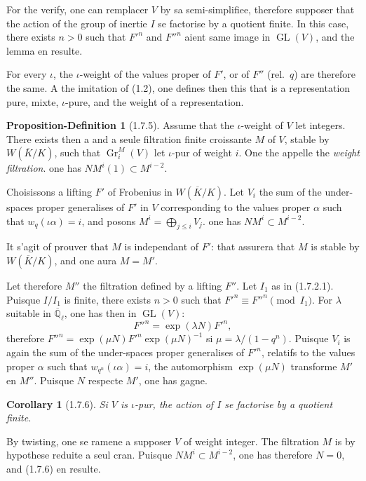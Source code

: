 \documentclass[12pt,a4paper]{article}
\theoremstyle{plain}
\newtheorem{corollary}[theorem]{Corollary}
\theoremstyle{definition}
\newtheorem{proposition-definition}[theorem]{Proposition-Definition}
\theoremstyle{definition}
\theoremstyle{remark}
\DeclareMathOperator{\GL}{GL}
\DeclareMathOperator{\Gr}{Gr}
\begin{document}
For the verify, one can remplacer $V$ by sa semi-simplifiee, therefore supposer that the action of the group of inertie $I$ se factorise by a quotient finite. In this case, there exists $n > 0$ such that $F'^n$ and $F''^n$ aient same image in $\GL(V)$, and the lemma en resulte.

For every $\iota$, the $\iota$-weight of the values proper of $F'$, or of $F''$ (rel.~$q$) are therefore the same. A the imitation of (1.2), one defines then this that is a representation pure, mixte, $\iota$-pure, and the weight of a representation.

\begin{proposition-definition}[1.7.5]
Assume that the $\iota$-weight of $V$ let integers. There exists then a and a seule filtration finite croissante $M$ of $V$, stable by $W(\overline{K}/K)$, such that $\Gr_i^M(V)$ let $\iota$-pur of weight $i$. One the appelle the \emph{weight filtration}. one has $NM^i(1) \subset M^{i-2}$.
\end{proposition-definition}

Choisissons a lifting $F'$ of Frobenius in $W(\overline{K}/K)$. Let $V_i$ the sum of the under-spaces proper generalises of $F'$ in $V$ corresponding to the values proper $\alpha$ such that $w_q(\iota\alpha) = i$, and posons $M^i = \bigoplus_{j \leq i} V_j$. one has $NM^i \subset M^{i-2}$.

It s'agit of prouver that $M$ is independant of $F'$: that assurera that $M$ is stable by $W(\overline{K}/K)$, and one aura $M = M'$.

Let therefore $M''$ the filtration defined by a lifting $F''$. Let $I_1$ as in (1.7.2.1). Puisque $I/I_1$ is finite, there exists $n > 0$ such that $F'^n \equiv F''^n \pmod{I_1}$. For $\lambda$ suitable in $\overline{\mathbb{Q}}_\ell$, one has then in $\GL(V)$:
\[F''^n = \exp(\lambda N) F'^n,\]
therefore $F''^n = \exp(\mu N) F'^n \exp(\mu N)^{-1}$ si $\mu = \lambda/(1-q^n)$. Puisque $V_i$ is again the sum of the under-spaces proper generalises of $F'^n$, relatifs to the values proper $\alpha$ such that $w_{q^n}(\iota\alpha) = i$, the automorphism $\exp(\mu N)$ transforme $M'$ en $M''$. Puisque $N$ respecte $M'$, one has gagne.

\begin{corollary}[1.7.6]
Si $V$ is $\iota$-pur, the action of $I$ se factorise by a quotient finite.
\end{corollary}

By twisting, one se ramene a supposer $V$ of weight integer. The filtration $M$ is by hypothese reduite a seul cran. Puisque $NM^i \subset M^{i-2}$, one has therefore $N = 0$, and (1.7.6) en resulte.
\end{document}
